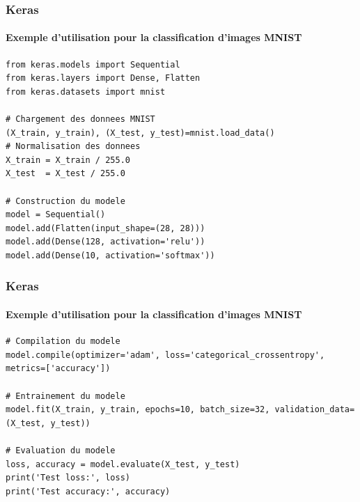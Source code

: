 \documentclass{beamer}
\begin{document}
\begin{frame}[fragile]
	\frametitle{Keras}
	\framesubtitle{Exemple d'utilisation pour la classification d'images MNIST}
\begin{lstlisting}
from keras.models import Sequential
from keras.layers import Dense, Flatten
from keras.datasets import mnist
		
# Chargement des donnees MNIST
(X_train, y_train), (X_test, y_test)=mnist.load_data()		
# Normalisation des donnees
X_train = X_train / 255.0
X_test  = X_test / 255.0

# Construction du modele
model = Sequential()
model.add(Flatten(input_shape=(28, 28)))
model.add(Dense(128, activation='relu'))
model.add(Dense(10, activation='softmax'))

\end{lstlisting}
\end{frame}
	
\begin{frame}[fragile]
	\frametitle{Keras}
	\framesubtitle{Exemple d'utilisation pour la classification d'images MNIST}
	\begin{lstlisting}
# Compilation du modele
model.compile(optimizer='adam', loss='categorical_crossentropy', metrics=['accuracy'])	 
	
# Entrainement du modele
model.fit(X_train, y_train, epochs=10, batch_size=32, validation_data=(X_test, y_test))	
	
# Evaluation du modele
loss, accuracy = model.evaluate(X_test, y_test)
print('Test loss:', loss)
print('Test accuracy:', accuracy)
	\end{lstlisting}
\end{frame}
\end{document}
